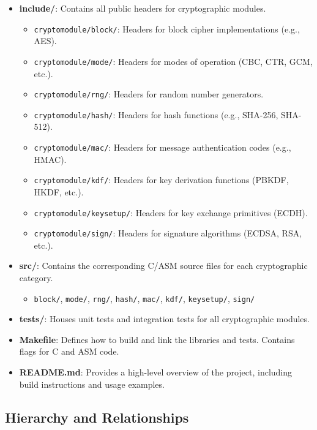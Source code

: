 \documentclass[11pt,a4paper]{report}
\theoremstyle{definitionstyle}
\begin{document}
\begin{itemize}
	\item \textbf{include/}: Contains all public headers for cryptographic modules.
	\begin{itemize}
		\item \texttt{cryptomodule/block/}: Headers for block cipher implementations (e.g., AES).
		\item \texttt{cryptomodule/mode/}: Headers for modes of operation (CBC, CTR, GCM, etc.).
		\item \texttt{cryptomodule/rng/}: Headers for random number generators.
		\item \texttt{cryptomodule/hash/}: Headers for hash functions (e.g., SHA-256, SHA-512).
		\item \texttt{cryptomodule/mac/}: Headers for message authentication codes (e.g., HMAC).
		\item \texttt{cryptomodule/kdf/}: Headers for key derivation functions (PBKDF, HKDF, etc.).
		\item \texttt{cryptomodule/keysetup/}: Headers for key exchange primitives (ECDH).
		\item \texttt{cryptomodule/sign/}: Headers for signature algorithms (ECDSA, RSA, etc.).
	\end{itemize}
	
	\item \textbf{src/}: Contains the corresponding C/ASM source files for each cryptographic category.
	\begin{itemize}
		\item \texttt{block/}, \texttt{mode/}, \texttt{rng/}, \texttt{hash/}, \texttt{mac/}, \texttt{kdf/}, \texttt{keysetup/}, \texttt{sign/}
	\end{itemize}
	
	\item \textbf{tests/}: Houses unit tests and integration tests for all cryptographic modules.
	
	\item \textbf{Makefile}: Defines how to build and link the libraries and tests. Contains flags for C and ASM code.
	
	\item \textbf{README.md}: Provides a high-level overview of the project, including build instructions and usage examples.
\end{itemize}

\subsection{Hierarchy and Relationships}
\end{document}
